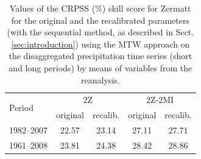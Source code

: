 \documentclass[hess, manuscript]{copernicus}
\begin{document}
	\begin{table}[htb]
		\caption{Values of the CRPSS (\%) skill score for Zermatt for the original and the recalibrated parameters (with the sequential method, as described in Sect. \ref{sec:introduction}) using the MTW approach on the disaggregated precipitation time series (short and long periods) by means of variables from the reanalysis.}
		\begin{center}
			\begin{tabular}{l c c c c}
				\hline
				\multirow{2}{*}{Period} & \multicolumn{2}{c}{2Z} & \multicolumn{ 2}{c}{2Z-2MI} \\
				& original & recalib. & original & recalib. \\
				\hline
				1982--2007 & 22.57 & 23.14 & 27.11 & 27.71 \\
				1961--2008 & 23.81 & 24.38 & 28.42 & 28.86 \\
				\hline
			\end{tabular}
		\end{center}
		\label{table:proxy_CRPSS}
	\end{table}
	
	
	
	
	
	
	
	
	
	
\end{document}
